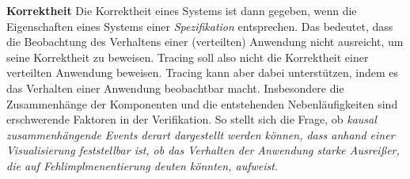 \textbf{Korrektheit} \space\space\space Die Korrektheit eines Systems ist dann gegeben, wenn die Eigenschaften eines Systems einer \emph{Spezifikation} entsprechen. Das bedeutet, dass die Beobachtung des Verhaltens einer (verteilten) Anwendung nicht ausreicht, um seine Korrektheit zu beweisen. Tracing soll also nicht die Korrektheit einer verteilten Anwendung beweisen. Tracing kann aber dabei unterstützen, indem es das Verhalten einer Anwendung beobachtbar macht. Insbesondere die Zusammenhänge der Komponenten und die entstehenden Nebenläufigkeiten sind erschwerende Faktoren in der Verifikation. So stellt sich die Frage, ob \emph{kausal zusammenhängende Events derart dargestellt werden können, dass anhand einer Visualisierung feststellbar ist, ob das Verhalten der Anwendung starke Ausreißer, die auf Fehlimplmenentierung deuten könnten, aufweist.}


